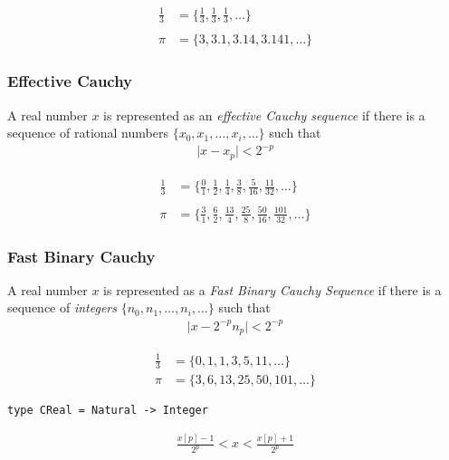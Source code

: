 \documentclass[11pt]{beamer}
\begin{document}
\begin{frame}
\begin{align*}
\frac{1}{3} &= \{\frac{1}{3}, \frac{1}{3}, \frac{1}{3}, \dots\} \\
~\\
\pi &= \{3, 3.1, 3.14, 3.141, \dots\}
\end{align*}
\end{frame}

\begin{frame}
\frametitle{Effective Cauchy}
\begin{definition}
A real number $x$ is represented as an \emph{effective Cauchy sequence} if
there is a sequence of rational numbers $\{x_0, x_1, \dots, x_i,
\dots\}$ such that
\begin{align*}
\vert x - x_p \vert < 2^{-p}
\end{align*}
\end{definition}
\begin{align*}
\frac{1}{3} &= \{\frac{0}{1}, \frac{1}{2}, \frac{1}{4}, \frac{3}{8}, \frac{5}{16}, \frac{11}{32}, \dots\}\\
~\\
\pi &= \{\frac{3}{1}, \frac{6}{2}, \frac{13}{4}, \frac{25}{8}, \frac{50}{16}, \frac{101}{32}, \dots\}
\end{align*}
\end{frame}

\begin{frame}[fragile]
\frametitle{Fast Binary Cauchy}
\begin{definition}
A real number $x$ is represented as a \emph{Fast Binary Cauchy Sequence} if
there is a sequence of \emph{integers} $\{n_0, n_1, \dots, n_i, \dots\}$ such that
\begin{align*}
\vert x - 2^{-p}n_p \vert < 2^{-p}
\end{align*}
\end{definition}
\begin{align*}
\frac{1}{3} &= \{0, 1, 1, 3, 5, 11, \dots \} \\
\pi &= \{3, 6, 13, 25, 50, 101, \dots \}
\end{align*}
\end{frame}

\begin{frame}[fragile]
\begin{verbatim}
type CReal = Natural -> Integer
\end{verbatim}
  \begin{align*}
\frac{x[p] - 1}{2^p} < x < \frac{x[p] + 1}{2^p}
\end{align*}
\end{frame}
\end{document}
